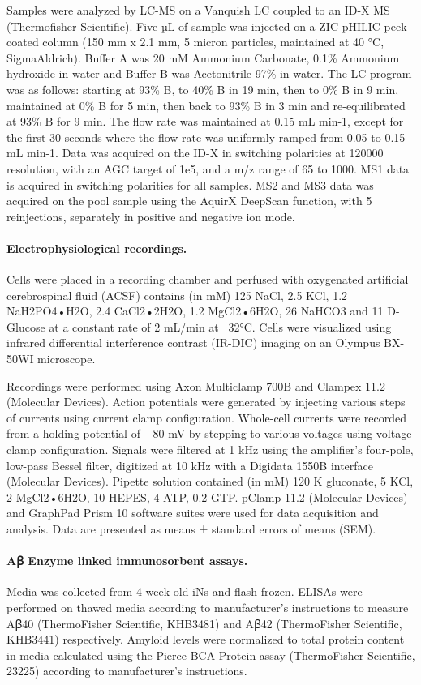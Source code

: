 Samples were analyzed by LC-MS on a Vanquish LC coupled to an ID-X MS (Thermofisher Scientific). Five µL of sample was injected on a ZIC-pHILIC peek-coated column (150 mm x 2.1 mm, 5 micron particles, maintained at 40 °C, SigmaAldrich). Buffer A was 20 mM Ammonium Carbonate, 0.1\% Ammonium hydroxide in water and Buffer B was Acetonitrile 97\% in water. The LC program was as follows: starting at 93\% B, to 40\% B in 19 min, then to 0\% B in 9 min, maintained at 0\% B for 5 min, then back to 93\% B in 3 min and re-equilibrated at 93\% B for 9 min. The flow rate was maintained at 0.15 mL min-1, except for the first 30 seconds where the flow rate was uniformly ramped from 0.05 to 0.15 mL min-1. Data was acquired on the ID-X in switching polarities at 120000 resolution, with an AGC target of 1e5, and a m/z range of 65 to 1000. MS1 data is acquired in switching polarities for all samples. MS2 and MS3 data was acquired on the pool sample using the AquirX DeepScan function, with 5 reinjections, separately in positive and negative ion mode. 


\paragraph{Electrophysiological recordings.}
Cells were placed in a recording chamber and perfused with oxygenated artificial cerebrospinal fluid (ACSF) contains (in mM) 125 NaCl, 2.5 KCl, 1.2 NaH2PO4•H2O, 2.4 CaCl2•2H2O, 1.2 MgCl2•6H2O, 26 NaHCO3 and 11 D-Glucose at a constant rate of 2 mL/min at ~32°C. Cells were visualized using infrared differential interference contrast (IR-DIC) imaging on an Olympus BX-50WI microscope.

Recordings were performed using Axon Multiclamp 700B and Clampex 11.2 (Molecular Devices). Action potentials were generated by injecting various steps of currents using current clamp configuration.  Whole-cell currents were recorded from a holding potential of −80 mV by stepping to various voltages using voltage clamp configuration. Signals were filtered at 1 kHz using the amplifier’s four-pole, low-pass Bessel filter, digitized at 10 kHz with a Digidata 1550B interface (Molecular Devices). Pipette solution contained (in mM) 120 K gluconate, 5 KCl, 2 MgCl2•6H2O, 10 HEPES, 4 ATP, 0.2 GTP. pClamp 11.2 (Molecular Devices) and GraphPad Prism 10 software suites were used for data acquisition and analysis. Data are presented as means ± standard errors of means (SEM).

\paragraph{Aꞵ Enzyme linked immunosorbent assays.}
Media was collected from 4 week old iNs and flash frozen. ELISAs were performed on thawed media according to manufacturer’s instructions to measure Aꞵ40 (ThermoFisher Scientific, KHB3481) and Aꞵ42 (ThermoFisher Scientific, KHB3441) respectively. Amyloid levels were normalized to total protein content in media calculated using the Pierce BCA Protein assay (ThermoFisher Scientific, 23225) according to manufacturer’s instructions.

